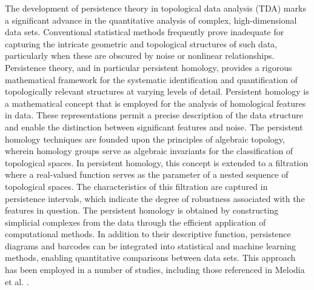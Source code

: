The development of persistence theory in topological data analysis (TDA) marks a significant advance in the quantitative analysis of complex, high-dimensional data sets. Conventional statistical methods frequently prove inadequate for capturing the intricate geometric and topological structures of such data, particularly when these are obscured by noise or nonlinear relationships. Persistence theory, and in particular persistent homology, provides a rigorous mathematical framework for the systematic identification and quantification of topologically relevant structures at varying levels of detail. Persistent homology is a mathematical concept that is employed for the analysis of homological features in data. These representations permit a precise description of the data structure and enable the distinction between significant features and noise. The persistent homology techniques are founded upon the principles of algebraic topology, wherein homology groups serve as algebraic invariants for the classification of topological spaces. In persistent homology, this concept is extended to a filtration where a real-valued function serves as the parameter of a nested sequence of topological spaces. The characteristics of this filtration are captured in persistence intervals, which indicate the degree of robustness associated with the features in question. The persistent homology is obtained by constructing simplicial complexes from the data through the efficient application of computational methods. In addition to their descriptive function, persistence diagrams and barcodes can be integrated into statistical and machine learning methods, enabling quantitative comparisons between data sets. This approach has been employed in a number of studies, including those referenced in Melodia et al. \cite{melodia2018deep,melodia2020persistent,melodia2021estimate,melodia2021homological}.

